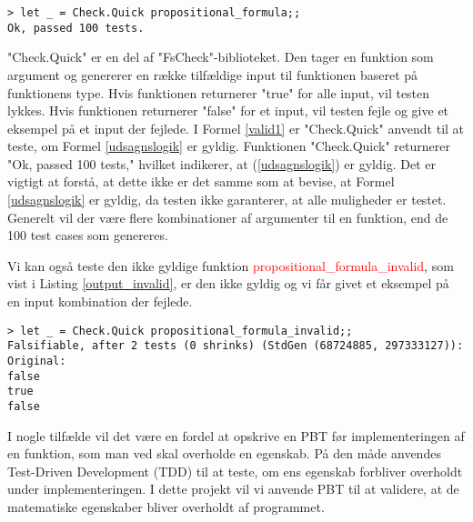

\begin{lstlisting}[style=output, label={lst:output_example}, caption={Output ved PBT af (\ref{udsagnslogik})}]
> let _ = Check.Quick propositional_formula;;
Ok, passed 100 tests.
\end{lstlisting}

"Check.Quick" er en del af "FsCheck"-biblioteket. Den tager en funktion som argument og genererer en række tilfældige input til funktionen baseret på funktionens type. Hvis funktionen returnerer "true" for alle input, vil testen lykkes. Hvis funktionen returnerer "false" for et input, vil testen fejle og give et eksempel på et input der fejlede. I Formel \ref{valid1} er "Check.Quick" anvendt til at teste, om Formel \eqref{udsagnslogik} er gyldig. Funktionen "Check.Quick" returnerer "Ok, passed 100 tests," hvilket indikerer, at (\ref{udsagnslogik}) er gyldig. Det er vigtigt at forstå, at dette ikke er det samme som at bevise, at Formel \eqref{udsagnslogik} er gyldig, da testen ikke garanterer, at alle muligheder er testet. Generelt vil der være flere kombinationer af argumenter til en funktion, end de 100 test cases som genereres.


Vi kan også teste den ikke gyldige funktion \textcolor{red}{propositional\_formula\_invalid}, som vist i Listing \ref{output_invalid}, er den ikke gyldig og vi får givet et eksempel på en input kombination der fejlede.

\begin{lstlisting}[style=output, label={output_invalid}, caption={Output ved PBT af \textcolor{red}{propositional\_formula\_invalid}}]
> let _ = Check.Quick propositional_formula_invalid;;
Falsifiable, after 2 tests (0 shrinks) (StdGen (68724885, 297333127)):
Original:
false
true
false
\end{lstlisting}

I nogle tilfælde vil det være en fordel at opskrive en PBT før implementeringen af en funktion, som man ved skal overholde en egenskab. På den måde anvendes Test-Driven Development (TDD) til at teste, om ens egenskab forbliver overholdt under implementeringen. I dette projekt vil vi anvende PBT til at validere, at de matematiske egenskaber bliver overholdt af programmet.
